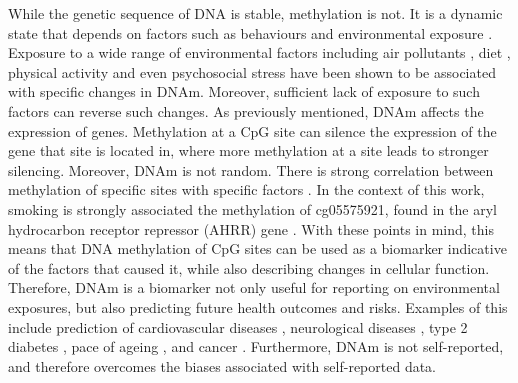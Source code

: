 \documentclass{article} %
\begin{document}

While the genetic sequence of DNA is stable, methylation is not. It is a dynamic state that depends on factors such as behaviours and environmental exposure \cite{greenberg2019diverse}. Exposure to a wide range of environmental factors including air pollutants \cite{martin2018environmental}, diet \cite{ma2020whole}, physical activity and even psychosocial stress \cite{opsasnick2024epigenome} have been shown to be associated with specific changes in DNAm. Moreover, sufficient lack of exposure to such factors can reverse such changes. As previously mentioned, DNAm affects the expression of genes. Methylation at a CpG site can silence the expression of the gene that site is located in, where more methylation at a site leads to stronger silencing. Moreover, DNAm is not random. There is strong correlation between methylation of specific sites with specific factors \cite{ewasatlas}. In the context of this work, smoking is strongly associated the methylation of cg05575921, found in the aryl hydrocarbon receptor
repressor (AHRR) gene \cite{reynolds2015dna}. With these points in mind, this means that DNA methylation of CpG sites can be used as a biomarker indicative of the factors that caused it, while also describing changes in cellular function. Therefore, DNAm is a biomarker not only useful for reporting on environmental exposures, but also predicting future health outcomes and risks. Examples of this include prediction of cardiovascular diseases \cite{cameron2023dna}, neurological diseases \cite{cells11213439}, type 2 diabetes \cite{cheng2023development}, pace of ageing \cite{10.7554/eLife.73420}, and cancer \cite{luo2020circulating}. Furthermore, DNAm is not self-reported, and therefore overcomes the biases associated with self-reported data.
\end{document}
